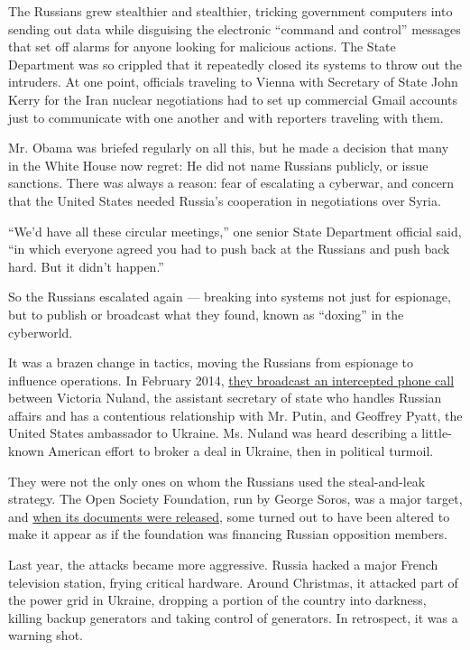 The Russians grew stealthier and stealthier, tricking government
computers into sending out data while disguising the electronic
``command and control'' messages that set off alarms for anyone looking
for malicious actions. The State Department was so crippled that it
repeatedly closed its systems to throw out the intruders. At one point,
officials traveling to Vienna with Secretary of State John Kerry for the
Iran nuclear negotiations had to set up commercial Gmail accounts just
to communicate with one another and with reporters traveling with them.

Mr. Obama was briefed regularly on all this, but he made a decision that
many in the White House now regret: He did not name Russians publicly,
or issue sanctions. There was always a reason: fear of escalating a
cyberwar, and concern that the United States needed Russia's cooperation
in negotiations over Syria.

``We'd have all these circular meetings,'' one senior State Department
official said, ``in which everyone agreed you had to push back at the
Russians and push back hard. But it didn't happen.''

So the Russians escalated again --- breaking into systems not just for
espionage, but to publish or broadcast what they found, known as
``doxing'' in the cyberworld.

It was a brazen change in tactics, moving the Russians from espionage to
influence operations. In February 2014,
\href{https://www.nytimes3xbfgragh.onion/2014/02/08/world/europe/ukraine.html}{they
broadcast an intercepted phone call} between Victoria Nuland, the
assistant secretary of state who handles Russian affairs and has a
contentious relationship with Mr. Putin, and Geoffrey Pyatt, the United
States ambassador to Ukraine. Ms. Nuland was heard describing a
little-known American effort to broker a deal in Ukraine, then in
political turmoil.

They were not the only ones on whom the Russians used the steal-and-leak
strategy. The Open Society Foundation, run by George Soros, was a major
target, and \href{http://soros.dcleaks.com/}{when its documents were
released}, some turned out to have been altered to make it appear as if
the foundation was financing Russian opposition members.

Last year, the attacks became more aggressive. Russia hacked a major
French television station, frying critical hardware. Around Christmas,
it attacked part of the power grid in Ukraine, dropping a portion of the
country into darkness, killing backup generators and taking control of
generators. In retrospect, it was a warning shot.

